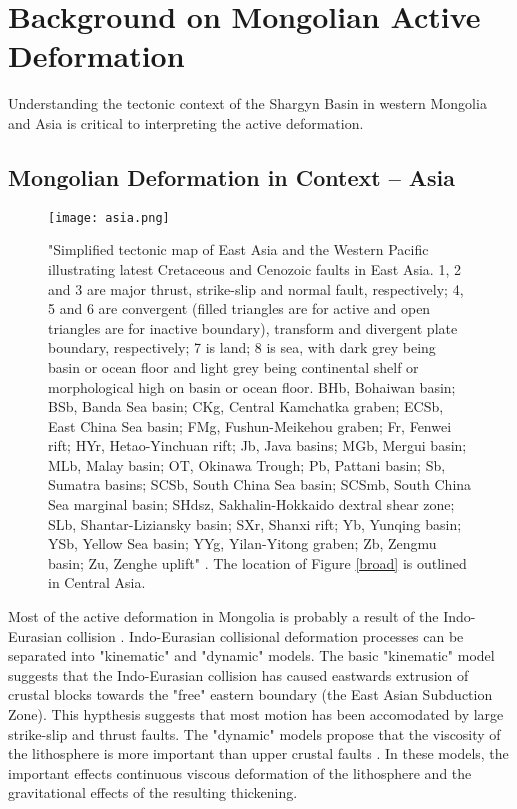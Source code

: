 \section{Background on Mongolian Active Deformation}
	Understanding the tectonic context of the Shargyn Basin in western Mongolia and Asia is critical to interpreting the active deformation. 

\subsection{Mongolian Deformation in Context -- Asia}

\begin{figure}[h!]
	\centering
	\texttt{[image: asia.png]}
	\caption{"Simplified tectonic map of East Asia and the Western Pacific illustrating latest Cretaceous and Cenozoic faults in East Asia. 1, 2 and 3 are major thrust, strike-slip and normal fault, respectively; 4, 5 and 6 are convergent (filled triangles are for active and open triangles are for inactive boundary), transform and divergent plate boundary, respectively; 7 is land; 8 is sea, with dark grey being basin or ocean floor and light grey being continental shelf or morphological high on basin or ocean floor. BHb, Bohaiwan basin; BSb, Banda Sea basin; CKg, Central Kamchatka graben; ECSb, East China Sea basin; FMg, Fushun-Meikehou graben; Fr, Fenwei rift; HYr, Hetao-Yinchuan rift; Jb, Java basins; MGb, Mergui basin; MLb, Malay basin; OT, Okinawa Trough; Pb, Pattani basin; Sb, Sumatra basins; SCSb, South China Sea basin; SCSmb, South China Sea marginal basin; SHdsz, Sakhalin-Hokkaido dextral shear zone; SLb, Shantar-Liziansky basin; SXr, Shanxi rift; Yb, Yunqing basin; YSb, Yellow Sea basin; YYg, Yilan-Yitong graben; Zb, Zengmu basin; Zu, Zenghe uplift" \citep{Schellart2005}. The location of Figure \ref{broad} is outlined in Central Asia. }
	\label{asia}
\end{figure}	

	Most of the active deformation in Mongolia is probably a result of the Indo-Eurasian collision \citep{Yin2010}\citep{Walker2007}\citep{Cunningham2005a}\citep{England1997}. Indo-Eurasian collisional deformation processes can be separated into "kinematic" and "dynamic" models. The basic "kinematic" model suggests that the Indo-Eurasian collision has caused eastwards extrusion of crustal blocks towards the "free" eastern boundary (the East Asian Subduction Zone)\citet{Tapponnier1982}\citep{Peltzer1996}. This hypthesis suggests that most motion has been accomodated by large strike-slip and thrust faults. The "dynamic" models propose that the viscosity of the lithosphere is more important than upper crustal faults \citep{Houseman1993}\citep{England1997}. In these models, the important effects continuous viscous deformation of the lithosphere and the gravitational effects of the resulting thickening. 

